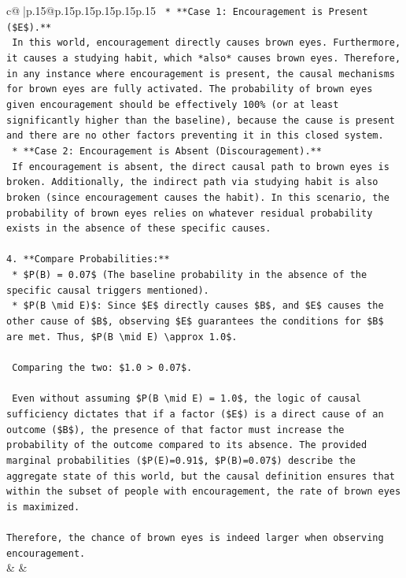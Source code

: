 \documentclass{article}
\begin{document}
{\begin{supertabular}{c@{$\;$}|p{.15\linewidth}@{}p{.15\linewidth}p{.15\linewidth}p{.15\linewidth}p{.15\linewidth}p{.15\linewidth}}
{{{\texttt{    *   **Case 1: Encouragement is Present (\$E\$).**} \\
\texttt{        In this world, encouragement directly causes brown eyes. Furthermore, it causes a studying habit, which *also* causes brown eyes. Therefore, in any instance where encouragement is present, the causal mechanisms for brown eyes are fully activated. The probability of brown eyes given encouragement should be effectively 100\% (or at least significantly higher than the baseline), because the cause is present and there are no other factors preventing it in this closed system.} \\
\texttt{    *   **Case 2: Encouragement is Absent (Discouragement).**} \\
\texttt{        If encouragement is absent, the direct causal path to brown eyes is broken. Additionally, the indirect path via studying habit is also broken (since encouragement causes the habit). In this scenario, the probability of brown eyes relies on whatever residual probability exists in the absence of these specific causes.} \\
\\ 
\texttt{4.  **Compare Probabilities:**} \\
\texttt{    *   \$P(B) = 0.07\$ (The baseline probability in the absence of the specific causal triggers mentioned).} \\
\texttt{    *   \$P(B \textbackslash{}mid E)\$: Since \$E\$ directly causes \$B\$, and \$E\$ causes the other cause of \$B\$, observing \$E\$ guarantees the conditions for \$B\$ are met. Thus, \$P(B \textbackslash{}mid E) \textbackslash{}approx 1.0\$.} \\
\\ 
\texttt{    Comparing the two: \$1.0 > 0.07\$.} \\
\\ 
\texttt{    Even without assuming \$P(B \textbackslash{}mid E) = 1.0\$, the logic of causal sufficiency dictates that if a factor (\$E\$) is a direct cause of an outcome (\$B\$), the presence of that factor must increase the probability of the outcome compared to its absence. The provided marginal probabilities (\$P(E)=0.91\$, \$P(B)=0.07\$) describe the aggregate state of this world, but the causal definition ensures that within the subset of people with encouragement, the rate of brown eyes is maximized.} \\
\\ 
\texttt{Therefore, the chance of brown eyes is indeed larger when observing encouragement.} \\
            }
        }
    }
    & & \\ \\


\end{supertabular}}
\end{document}
